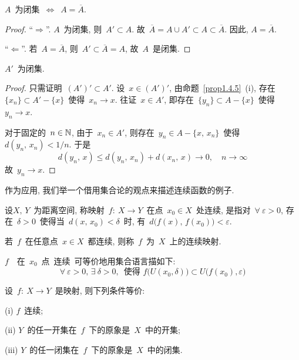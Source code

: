 \begin{theorem}
$A$~为闭集~$\Leftrightarrow$~$A = \overline{A}$.
\end{theorem}

\begin{proof}
``$\Rightarrow$''. $A$~为闭集, 则~$A' \subset A$. 故~$\overline{A} = A \cup A' \subset A \subset \overline{A}$. 因此, $A = \overline{A}$.

``$\Leftarrow$''. 若~$A = \overline{A}$, 则~$A' \subset \overline{A} = A$, 故~$A$~是闭集.
\end{proof}

\begin{theorem}
$A'$~为闭集.
\end{theorem}

\begin{proof}
只需证明~$(A')' \subset A'$. 设~$x \in (A')'$, 由命题~\ref{prop1.4.5}~(i), 存在~$\{x_n\} \subset A' - \{x\}$~使得~$x_n \rightarrow x$. 往证~$x \in A'$, 即存在~$\{y_n\} \subset A - \{x\}$~使得~$y_n \rightarrow x$.

对于固定的~$n \in \mathbb{N}$, 由于~$x_n \in A'$, 则存在~$y_n \in A - \{x,\,x_n\}$~使得~$d(y_n,\,x_n) < 1/n$. 于是
\[
d(y_n,\,x) \leqslant d(y_n,\,x_n) + d(x_n,\,x) \rightarrow 0, \quad n \to \infty
\]
故~$y_n \rightarrow x$.
\end{proof}

作为应用, 我们举一个借用集合论的观点来描述连续函数的例子.

\begin{definition}
设$X,\,Y$~为距离空间, 称映射~$f:\: X \rightarrow Y$~在点~$x_0 \in X$~处连续, 是指对~$\forall~\varepsilon > 0$, 存在~$\delta > 0$~使得当~$d(x,\,x_0) < \delta$~时, 有~$d\big(f(x),\,f(x_0)\big) < \varepsilon$.

若~$f$~在任意点~$x \in X$~都连续, 则称~$f$~为~$X$~上的连续映射.
\end{definition}

\begin{remark}
$f$~~在~$x_0$~点~连续~可等价地用集合语言描如下:
\[
\forall~\varepsilon >0, \, \exists~\delta > 0, \, \text{~使得~} f\big(U(x_0, \delta)\big) \subset U\big(f(x_0), \varepsilon \big)
\]
\end{remark}

\begin{theorem} \label{thm1.4.1}
设~$f: \: X \rightarrow Y$~是映射, 则下列条件等价:

(i) $f$~连续;

(ii) $Y$~的任一开集在~$f$~下的原象是~$X$~中的开集;

(iii) $Y$~的任一闭集在~$f$~下的原象是~$X$~中的闭集.
\end{theorem}

